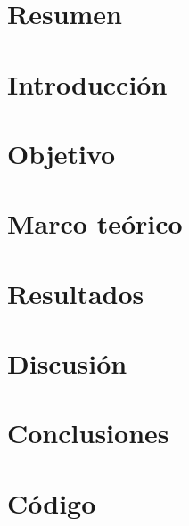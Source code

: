\documentclass[12pt,letterpaper]{article}
\begin{document}

\section{Resumen}

\section{Introducción}

\section{Objetivo}

\section{Marco teórico}

\section{Resultados}

\section{Discusión}

\section{Conclusiones}

\section{Código}


\nocite{*}

\end{document}
